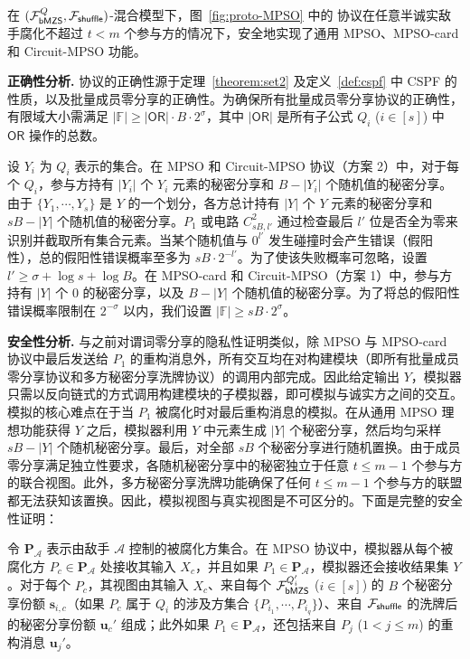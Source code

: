 \begin{theorem}\label{theorem:mpso}
在 $(\mathcal{F}_\mathsf{bMZS}^Q, \mathcal{F}_\mathsf{shuffle})$-混合模型下，图~\ref{fig:proto-MPSO} 中的  协议在任意半诚实敌手腐化不超过 $t < m$ 个参与方的情况下，安全地实现了通用 MPSO、MPSO-card 和 Circuit-MPSO 功能。
\end{theorem}

\begin{trivlist}
\item \textbf{正确性分析.} 协议的正确性源于定理~\ref{theorem:set2} 及定义~\ref{def:cspf} 中 CSPF 的性质，以及批量成员零分享的正确性。为确保所有批量成员零分享协议的正确性，有限域大小需满足 $\lvert \mathbb{F} \rvert \ge \lvert \mathsf{OR} \rvert \cdot B \cdot 2^\sigma$，其中 $\lvert \mathsf{OR} \rvert$ 是所有子公式 $Q_i$ ($i \in [s]$) 中 $\mathsf{OR}$ 操作的总数。

设 $Y_i$ 为 $Q_i$ 表示的集合。在 MPSO 和 Circuit-MPSO 协议（方案 2）中，对于每个 $Q_i$，参与方持有 $\lvert Y_i \rvert$ 个 $Y_i$ 元素的秘密分享和 $B-\lvert Y_i \rvert$ 个随机值的秘密分享。由于 $\{Y_1, \cdots, Y_s\}$ 是 $Y$ 的一个划分，各方总计持有 $\lvert Y \rvert$ 个 $Y$ 元素的秘密分享和 $sB-\lvert Y \rvert$ 个随机值的秘密分享。$P_1$ 或电路 $C_{sB,l'}^2$ 通过检查最后 $l'$ 位是否全为零来识别并截取所有集合元素。当某个随机值与 $0^{l'}$ 发生碰撞时会产生错误（假阳性），总的假阳性错误概率至多为 $sB \cdot 2^{-l'}$。为了使该失败概率可忽略，设置 $l' \ge \sigma + \log s + \log B$。在 MPSO-card 和 Circuit-MPSO（方案 1）中，参与方持有 $\lvert Y \rvert$ 个 0 的秘密分享，以及 $B-\lvert Y \rvert$ 个随机值的秘密分享。为了将总的假阳性错误概率限制在 $2^{-\sigma}$ 以内，我们设置 $\lvert \mathbb{F} \rvert \ge sB \cdot 2^\sigma$。

\item \textbf{安全性分析.} 与之前对谓词零分享的隐私性证明类似，除 MPSO 与 MPSO-card 协议中最后发送给 $P_1$ 的重构消息外，所有交互均在对构建模块（即所有批量成员零分享协议和多方秘密分享洗牌协议）的调用内部完成。因此给定输出 $Y$，模拟器只需以反向链式的方式调用构建模块的子模拟器，即可模拟与诚实方之间的交互。模拟的核心难点在于当 $P_1$ 被腐化时对最后重构消息的模拟。在从通用 MPSO 理想功能获得 $Y$ 之后，模拟器利用 $Y$ 中元素生成 $\lvert Y \rvert$ 个秘密分享，然后均匀采样 $sB - \lvert Y \rvert$ 个随机秘密分享。最后，对全部 $sB$ 个秘密分享进行随机置换。由于成员零分享满足独立性要求，各随机秘密分享中的秘密独立于任意 $t \le m-1$ 个参与方的联合视图。此外，多方秘密分享洗牌功能确保了任何 $t \le m-1$ 个参与方的联盟都无法获知该置换。因此，模拟视图与真实视图是不可区分的。下面是完整的安全性证明：

令 $\textbf{P}_{\mathcal{A}}$ 表示由敌手 $\mathcal{A}$ 控制的被腐化方集合。在 MPSO 协议中，模拟器从每个被腐化方 $P_c \in \textbf{P}_{\mathcal{A}}$ 处接收其输入 $X_c$，并且如果 $P_1 \in \textbf{P}_{\mathcal{A}}$，模拟器还会接收结果集 $Y$。对于每个 $P_c$，其视图由其输入 $X_c$、来自每个 $\mathcal{F}_\mathsf{bMZS}^{Q'_i}$ ($i \in [s]$) 的 $B$ 个秘密分享份额 $\textbf{s}_{i, c}$（如果 $P_c$ 属于 $Q_i$ 的涉及方集合 $\{P_{i_1},\cdots,P_{i_q}\}$）、来自 $\mathcal{F}_\mathsf{shuffle}$ 的洗牌后的秘密分享份额 $\textbf{u}_{c}'$ 组成；此外如果 $P_1 \in \textbf{P}_{\mathcal{A}}$，还包括来自 $P_j$ ($1 < j \le m$) 的重构消息 $\textbf{u}_j'$。


\end{trivlist}
